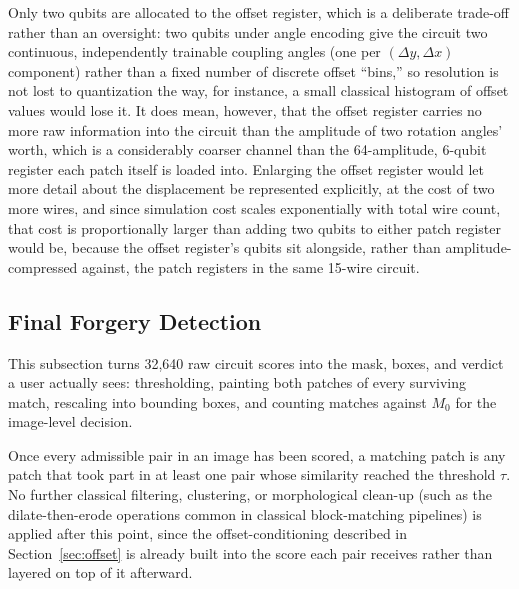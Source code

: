 \documentclass[conference]{IEEEtran}
\begin{document}
Only two qubits are allocated to the offset register, which is a deliberate trade-off rather than an oversight: two qubits under angle encoding give the circuit two continuous, independently trainable coupling angles (one per $(\Delta y, \Delta x)$ component) rather than a fixed number of discrete offset ``bins,'' so resolution is not lost to quantization the way, for instance, a small classical histogram of offset values would lose it. It does mean, however, that the offset register carries no more raw information into the circuit than the amplitude of two rotation angles' worth, which is a considerably coarser channel than the 64-amplitude, 6-qubit register each patch itself is loaded into. Enlarging the offset register would let more detail about the displacement be represented explicitly, at the cost of two more wires, and since simulation cost scales exponentially with total wire count, that cost is proportionally larger than adding two qubits to either patch register would be, because the offset register's qubits sit alongside, rather than amplitude-compressed against, the patch registers in the same 15-wire circuit.

\subsection{Final Forgery Detection}\label{sec:finaldetection}
This subsection turns 32,640 raw circuit scores into the mask, boxes, and verdict a user actually sees: thresholding, painting both patches of every surviving match, rescaling into bounding boxes, and counting matches against $M_0$ for the image-level decision.

Once every admissible pair in an image has been scored, a matching patch is any patch that took part in at least one pair whose similarity reached the threshold $\tau$. No further classical filtering, clustering, or morphological clean-up (such as the dilate-then-erode operations common in classical block-matching pipelines) is applied after this point, since the offset-conditioning described in Section~\ref{sec:offset} is already built into the score each pair receives rather than layered on top of it afterward.
\end{document}
